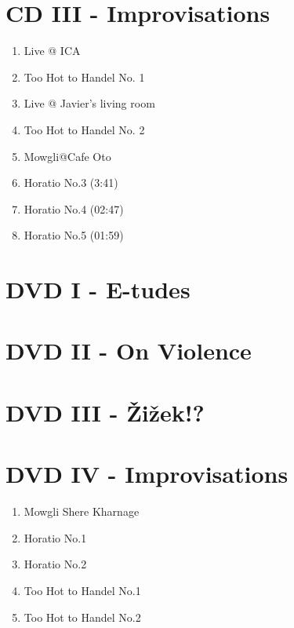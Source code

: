 \section*{CD III - Improvisations}

\begin{enumerate}
\item Live @ ICA
\item Too Hot to Handel No. 1
\item Live @ Javier's living room
\item Too Hot to Handel No. 2
\item Mowgli@Cafe Oto

\item Horatio No.3 (3:41)
\item Horatio No.4 (02:47)
\item Horatio No.5 (01:59)
\end{enumerate}

\section*{DVD I - E-tudes}

\section*{DVD II - On Violence}

\section*{DVD III - \v{Z}i\v{z}ek!?}

\section*{DVD IV - Improvisations}

\begin{enumerate}
\item Mowgli Shere Kharnage
\item Horatio No.1 
\item Horatio No.2 
\item Too Hot to Handel No.1
\item Too Hot to Handel No.2
\end{enumerate}